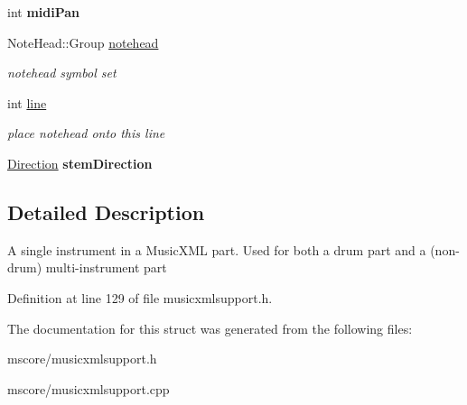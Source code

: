 \begin{DoxyCompactItemize}
\mbox{\label{struct_ms_1_1_music_x_m_l_drum_instrument_afcbdb83904ff6e9af343c3f50673c62f}} 
int {\bfseries midi\+Pan}
\item 
\mbox{\label{struct_ms_1_1_music_x_m_l_drum_instrument_a7277ebfabce59ebd77342fa6918e8613}} 
Note\+Head\+::\+Group \hyperlink{struct_ms_1_1_music_x_m_l_drum_instrument_a7277ebfabce59ebd77342fa6918e8613}{notehead}
\begin{DoxyCompactList}\small\item\em notehead symbol set \end{DoxyCompactList}\item 
\mbox{\label{struct_ms_1_1_music_x_m_l_drum_instrument_a1b52e9bff1f54a32e85586169b646a21}} 
int \hyperlink{struct_ms_1_1_music_x_m_l_drum_instrument_a1b52e9bff1f54a32e85586169b646a21}{line}
\begin{DoxyCompactList}\small\item\em place notehead onto this line \end{DoxyCompactList}\item 
\mbox{\label{struct_ms_1_1_music_x_m_l_drum_instrument_a376178d58678571e4ae0730af14e91ce}} 
\hyperlink{class_ms_1_1_direction}{Direction} {\bfseries stem\+Direction}
\end{DoxyCompactItemize}


\subsection{Detailed Description}
A single instrument in a Music\+X\+ML part. Used for both a drum part and a (non-\/drum) multi-\/instrument part 

Definition at line 129 of file musicxmlsupport.\+h.



The documentation for this struct was generated from the following files\+:\begin{DoxyCompactItemize}
\item 
mscore/musicxmlsupport.\+h\item 
mscore/musicxmlsupport.\+cpp\end{DoxyCompactItemize}
